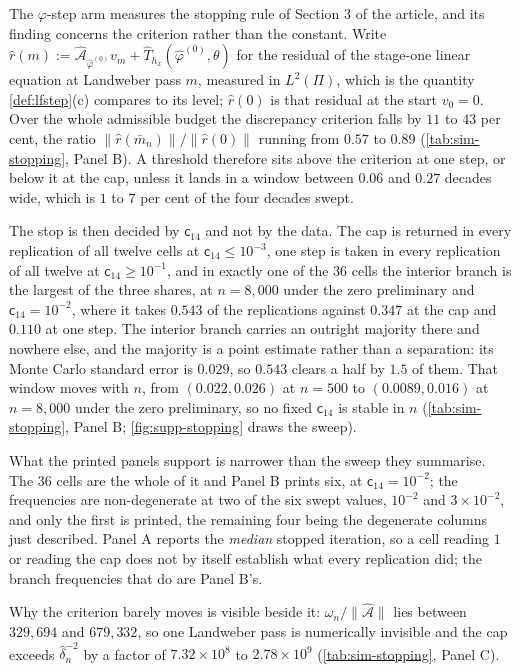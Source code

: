 \documentclass[
  12pt]{article}
\newcommand{\1}[1]{\mathds{1}\left[#1\right]}
\theoremstyle{plain}
\theoremstyle{definition}
\theoremstyle{definition}
\theoremstyle{remark}
\begin{document}
The $\varphi$-step arm measures the stopping rule of Section 3 of the article, and its finding
concerns the criterion rather than the constant. Write
$\hat r(m):=\hat{\mathcal A}_{\hat\varphi^{(0)}}v_m
+\hat T_{h_x}(\hat\varphi^{(0)},\theta)$ for the residual of the stage-one linear
equation at Landweber pass $m$, measured in $L^{2}(\Pi)$, which is the quantity
\cref{def:lfstep}(c) compares to its level; $\hat r(0)$ is that residual at the
start $v_0=0$. Over the whole admissible budget the discrepancy criterion falls
by $11$ to $43$ per cent, the ratio
$\|\hat r(\bar m_n)\|/\|\hat r(0)\|$ running from $0.57$ to $0.89$
(\cref{tab:sim-stopping}, Panel B). A threshold therefore sits above the criterion at
one step, or below it at the cap, unless it lands in a window between $0.06$ and
$0.27$ decades wide, which is $1$ to $7$ per cent of the four decades swept.

The stop is then decided by $\mathsf c_{14}$ and not by the data. The cap is
returned in every replication of all twelve cells at $\mathsf c_{14}\le10^{-3}$,
one step is taken in every replication of all twelve at
$\mathsf c_{14}\ge10^{-1}$, and in exactly one of the $36$ cells the interior
branch is the largest of the three shares, at $n=8{,}000$ under the zero
preliminary and $\mathsf c_{14}=10^{-2}$, where it takes $0.543$ of the
replications against $0.347$ at the cap and $0.110$ at one step. The interior
branch carries an outright majority there and nowhere else, and the majority is
a point estimate rather than a separation: its Monte Carlo standard error is
$0.029$, so $0.543$ clears a half by $1.5$ of them. That window moves with $n$,
from $(0.022,0.026)$
at $n=500$ to $(0.0089,0.016)$ at $n=8{,}000$ under the zero preliminary, so no
fixed $\mathsf c_{14}$ is stable in $n$ (\cref{tab:sim-stopping}, Panel B;
\cref{fig:supp-stopping} draws the sweep).

What the printed panels support is narrower than the sweep they summarise. The
$36$ cells are the whole of it and Panel B prints six, at
$\mathsf c_{14}=10^{-2}$; the frequencies are non-degenerate at two of the six
swept values, $10^{-2}$ and $3\times10^{-2}$, and only the first is printed, the
remaining four being the degenerate columns just described. Panel A reports the
\emph{median} stopped iteration, so a cell reading $1$ or reading the cap does
not by itself establish what every replication did; the branch frequencies that
do are Panel B's.

Why the criterion barely moves is visible beside it:
$\omega_n/\|\hat{\mathcal A}\|$ lies between $329{,}694$ and $679{,}332$, so one
Landweber pass is numerically invisible and the cap exceeds $\hat\delta_n^{-2}$
by a factor of $7.32\times10^{8}$ to $2.78\times10^{9}$
(\cref{tab:sim-stopping}, Panel C).
\end{document}
